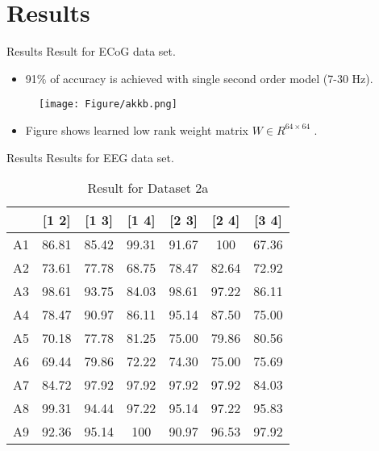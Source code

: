 \documentclass[11pt]{beamer}
\begin{document}
 \section{Results}
\begin{frame}{Results}
Result for ECoG data set.
 \begin{itemize} [default]
\item 91$\%$ of accuracy is achieved with single second order model  (7-30 Hz).
  \end{itemize}
  \begin{figure}
\texttt{[image: Figure/akkb.png]}
\end{figure}
\begin{itemize} [default]
\item Figure shows learned low rank weight matrix $W\in R^{64\times 64}$ .
  \end{itemize}
 \end{frame}
\begin{frame}{Results}
Results for EEG data set.
 \begin{table}[hbtp]
 \caption {Result for Dataset 2a}
 \centering
    \begin{tabular}{|c|c|c|c|c|c|c|}
    \hline
    ~  & [1 2] & [1 3] & [1 4] & [2 3] & [2 4] & [3 4] \\ \hline
    A1 & 86.81 & 85.42 & 99.31 & 91.67 & 100   & 67.36 \\ \hline
    A2 & 73.61 & 77.78 & 68.75 & 78.47 & 82.64 & 72.92 \\ \hline
    A3 & 98.61 & 93.75 & 84.03 & 98.61 & 97.22 & 86.11 \\ \hline
    A4 & 78.47 & 90.97 & 86.11 & 95.14 & 87.50 & 75.00 \\ \hline
    A5 & 70.18 & 77.78 & 81.25 & 75.00 & 79.86 & 80.56 \\ \hline
    A6 & 69.44 & 79.86 & 72.22 & 74.30 & 75.00 & 75.69 \\ \hline
    A7 & 84.72 & 97.92 & 97.92 & 97.92 & 97.92 & 84.03 \\ \hline
    A8 & 99.31 & 94.44 & 97.22 & 95.14 & 97.22 & 95.83 \\ \hline
    A9 & 92.36 & 95.14 & 100   & 90.97 & 96.53 & 97.92 \\ \hline
    \end{tabular}
    
   
    \label{akb1}
\end{table}
 \end{frame}
\end{document}
